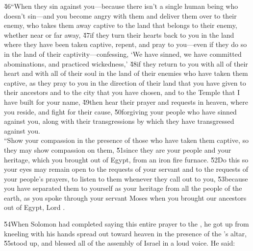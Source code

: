 \begin{poetry}
\poeml \v{46}``When they sin against you---because there isn't a single human being who doesn't sin---and you become angry with them and deliver them over to their enemy, who takes them away captive to the land that belongs to their enemy, whether near or far away, \v{47}if they turn their hearts back to you in the land where they have been taken captive, repent, and pray to you---even if they do so in the land of their captivity---confessing, `We have sinned, we have committed abominations, and practiced wickedness,' \v{48}if they return to you with all of their heart and with all of their soul in the land of their enemies who have taken them captive, as they pray to you in the direction of their land that you have given to their ancestors and to the city that you have chosen, and to the Temple that I have built for your name, \v{49}then hear their prayer and requests in heaven, where you reside, and fight for their cause, \v{50}forgiving your people who have sinned against you, along with their transgressions by which they have transgressed against you. \\
\poeml ``Show your compassion in the presence of those who have taken them captive, so they may show compassion on them, \v{51}since they are your people and your heritage, which you brought out of Egypt, from an iron fire furnace. \v{52}Do this so your eyes may remain open to the requests of your servant and to the requests of your people's prayers, to listen to them whenever they call out to you, \v{53}because you have separated them to yourself as your heritage from all the people of the earth, as you spoke through your servant Moses when you brought our ancestors out of Egypt, Lord .
\end{poetry}

\v{54}When Solomon had completed saying this entire prayer to the , he got up from kneeling with his hands spread out toward heaven in the presence of the 's altar, \v{55}stood up, and blessed all of the assembly of Israel in a loud voice. He said:

